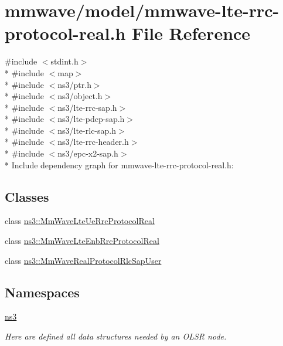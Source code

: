 \hypertarget{mmwave-lte-rrc-protocol-real_8h}{}\section{mmwave/model/mmwave-\/lte-\/rrc-\/protocol-\/real.h File Reference}
\label{mmwave-lte-rrc-protocol-real_8h}
{\ttfamily \#include $<$stdint.\+h$>$}\\*
{\ttfamily \#include $<$map$>$}\\*
{\ttfamily \#include $<$ns3/ptr.\+h$>$}\\*
{\ttfamily \#include $<$ns3/object.\+h$>$}\\*
{\ttfamily \#include $<$ns3/lte-\/rrc-\/sap.\+h$>$}\\*
{\ttfamily \#include $<$ns3/lte-\/pdcp-\/sap.\+h$>$}\\*
{\ttfamily \#include $<$ns3/lte-\/rlc-\/sap.\+h$>$}\\*
{\ttfamily \#include $<$ns3/lte-\/rrc-\/header.\+h$>$}\\*
{\ttfamily \#include $<$ns3/epc-\/x2-\/sap.\+h$>$}\\*
Include dependency graph for mmwave-\/lte-\/rrc-\/protocol-\/real.h\+:
\subsection*{Classes}
\begin{DoxyCompactItemize}
\item 
class \hyperlink{classns3_1_1MmWaveLteUeRrcProtocolReal}{ns3\+::\+Mm\+Wave\+Lte\+Ue\+Rrc\+Protocol\+Real}
\item 
class \hyperlink{classns3_1_1MmWaveLteEnbRrcProtocolReal}{ns3\+::\+Mm\+Wave\+Lte\+Enb\+Rrc\+Protocol\+Real}
\item 
class \hyperlink{classns3_1_1MmWaveRealProtocolRlcSapUser}{ns3\+::\+Mm\+Wave\+Real\+Protocol\+Rlc\+Sap\+User}
\end{DoxyCompactItemize}
\subsection*{Namespaces}
\begin{DoxyCompactItemize}
\item 
 \hyperlink{namespacens3}{ns3}
\begin{DoxyCompactList}\small\item\em Here are defined all data structures needed by an O\+L\+SR node. \end{DoxyCompactList}\end{DoxyCompactItemize}
